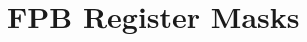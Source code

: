 \hypertarget{group___f_p_b___register___masks}{}\section{F\+PB Register Masks}
\label{group___f_p_b___register___masks}
